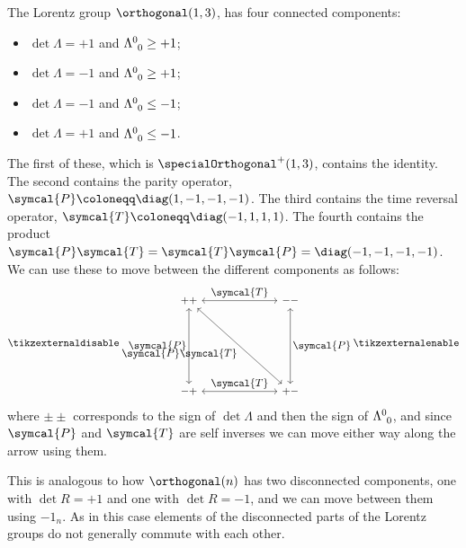 \documentclass[fleqn]{NotesClass}
\newcommand{\ident}{1}
\newcommand{\parity}{\symcal{P}}
\newcommand{\timeReversal}{\symcal{T}}
\begin{document}
    The Lorentz group \(\orthogonal(1, 3)\), has four connected components:
    \begin{itemize}
        \item \(\det \Lambda = +1\) and \(\tensor{\Lambda}{^0_0} \ge +1\);
        \item \(\det \Lambda = -1\) and \(\tensor{\Lambda}{^0_0} \ge +1\);
        \item \(\det \Lambda = -1\) and \(\tensor{\Lambda}{^0_0} \le -1\);
        \item \(\det \Lambda = +1\) and \(\tensor{\Lambda}{^0_0} \le -1\).
    \end{itemize}
    The first of these, which is \(\specialOrthogonal^+(1, 3)\), contains the identity.
    The second contains the parity operator, \(\parity \coloneqq \diag(1, -1, -1, -1)\).
    The third contains the time reversal operator, \(\timeReversal \coloneqq \diag(-1, 1, 1, 1)\).
    The fourth contains the product \(\parity \timeReversal = \timeReversal \parity = \diag(-1, -1, -1, -1)\).
    We can use these to move between the different components as follows:
    \begin{equation}
        \tikzexternaldisable
        \begin{tikzcd}[sep=2.5cm, arrows={<->}]
            ++ \arrow[r, "\displaystyle\timeReversal"] \arrow[d, "\displaystyle\parity"'] \arrow[dr, "\displaystyle\parity\timeReversal"'] & -- \arrow[d, "\displaystyle\parity"]\\
            -+ \arrow[r, "\displaystyle\timeReversal"] & +-
        \end{tikzcd}
        \tikzexternalenable
    \end{equation}
    where \(\pm\pm\) corresponds to the sign of \(\det \Lambda\) and then the sign of \(\tensor{\Lambda}{^0_0}\), and since \(\parity\) and \(\timeReversal\) are self inverses we can move either way along the arrow using them.
    
    This is analogous to how \(\orthogonal(n)\) has two disconnected components, one with \(\det R = +1\) and one with \(\det R = -1\), and we can move between them using \(-\ident_n\).
    As in this case elements of the disconnected parts of the Lorentz groups do not generally commute with each other.
    
\end{document}
